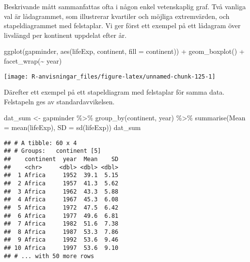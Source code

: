 \documentclass[
]{book}
\newenvironment{Shaded}{\begin{snugshade}}{\end{snugshade}}
\newcommand{\AttributeTok}[1]{\textcolor[rgb]{0.77,0.63,0.00}{#1}}
\newcommand{\FunctionTok}[1]{\textcolor[rgb]{0.00,0.00,0.00}{#1}}
\newcommand{\NormalTok}[1]{#1}
\newcommand{\OtherTok}[1]{\textcolor[rgb]{0.56,0.35,0.01}{#1}}
\newcommand{\SpecialCharTok}[1]{\textcolor[rgb]{0.00,0.00,0.00}{#1}}
\theoremstyle{definition}
\theoremstyle{definition}
\theoremstyle{definition}
\theoremstyle{definition}
\theoremstyle{remark}
\begin{document}
Beskrivande mått sammanfattas ofta i någon enkel vetenskaplig graf. Två vanliga val är lådagrammet, som illustrerar kvartiler och möjliga extremvärden, och stapeldiagrammet med felstaplar. Vi ger först ett exempel på ett lådagram över livslängd per kontinent uppdelat efter år.

\begin{Shaded}
\begin{Highlighting}[]
\FunctionTok{ggplot}\NormalTok{(gapminder, }\FunctionTok{aes}\NormalTok{(lifeExp, continent, }\AttributeTok{fill =}\NormalTok{ continent)) }\SpecialCharTok{+}
  \FunctionTok{geom\_boxplot}\NormalTok{() }\SpecialCharTok{+}
  \FunctionTok{facet\_wrap}\NormalTok{(}\SpecialCharTok{\textasciitilde{}}\NormalTok{ year)}
\end{Highlighting}
\end{Shaded}

\begin{center}\texttt{[image: R-anvisningar\_files/figure-latex/unnamed-chunk-125-1]} \end{center}

Därefter ett exempel på ett stapeldiagram med felstaplar för samma data. Felstapeln ges av standardavvikelsen.

\begin{Shaded}
\begin{Highlighting}[]
\NormalTok{dat\_sum }\OtherTok{\textless{}{-}}\NormalTok{ gapminder }\SpecialCharTok{\%\textgreater{}\%} 
  \FunctionTok{group\_by}\NormalTok{(continent, year) }\SpecialCharTok{\%\textgreater{}\%} 
  \FunctionTok{summarise}\NormalTok{(}\AttributeTok{Mean =} \FunctionTok{mean}\NormalTok{(lifeExp),}
            \AttributeTok{SD =} \FunctionTok{sd}\NormalTok{(lifeExp))}
\NormalTok{dat\_sum}
\end{Highlighting}
\end{Shaded}

\begin{verbatim}
## # A tibble: 60 x 4
## # Groups:   continent [5]
##    continent  year  Mean    SD
##    <chr>     <dbl> <dbl> <dbl>
##  1 Africa     1952  39.1  5.15
##  2 Africa     1957  41.3  5.62
##  3 Africa     1962  43.3  5.88
##  4 Africa     1967  45.3  6.08
##  5 Africa     1972  47.5  6.42
##  6 Africa     1977  49.6  6.81
##  7 Africa     1982  51.6  7.38
##  8 Africa     1987  53.3  7.86
##  9 Africa     1992  53.6  9.46
## 10 Africa     1997  53.6  9.10
## # ... with 50 more rows
\end{verbatim}
\end{document}
